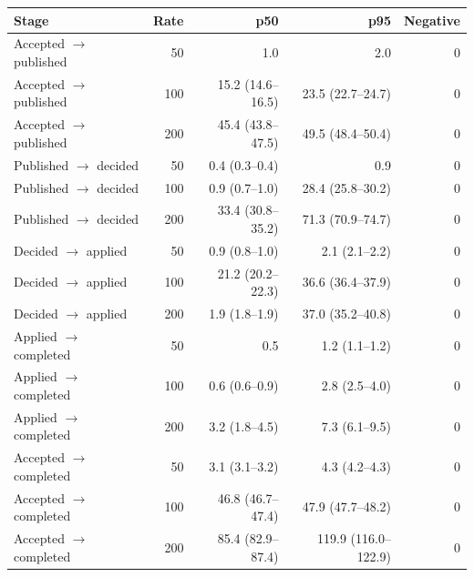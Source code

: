 \begin{tabular}{lrrrr}
\toprule
Stage & Rate & p50 & p95 & Negative \\
\midrule
Accepted $\to$ published & 50 & 1.0 & 2.0 & 0 \\
Accepted $\to$ published & 100 & 15.2 (14.6--16.5) & 23.5 (22.7--24.7) & 0 \\
Accepted $\to$ published & 200 & 45.4 (43.8--47.5) & 49.5 (48.4--50.4) & 0 \\
\addlinespace[2pt]
Published $\to$ decided & 50 & 0.4 (0.3--0.4) & 0.9 & 0 \\
Published $\to$ decided & 100 & 0.9 (0.7--1.0) & 28.4 (25.8--30.2) & 0 \\
Published $\to$ decided & 200 & 33.4 (30.8--35.2) & 71.3 (70.9--74.7) & 0 \\
\addlinespace[2pt]
Decided $\to$ applied & 50 & 0.9 (0.8--1.0) & 2.1 (2.1--2.2) & 0 \\
Decided $\to$ applied & 100 & 21.2 (20.2--22.3) & 36.6 (36.4--37.9) & 0 \\
Decided $\to$ applied & 200 & 1.9 (1.8--1.9) & 37.0 (35.2--40.8) & 0 \\
\addlinespace[2pt]
Applied $\to$ completed & 50 & 0.5 & 1.2 (1.1--1.2) & 0 \\
Applied $\to$ completed & 100 & 0.6 (0.6--0.9) & 2.8 (2.5--4.0) & 0 \\
Applied $\to$ completed & 200 & 3.2 (1.8--4.5) & 7.3 (6.1--9.5) & 0 \\
\addlinespace[2pt]
Accepted $\to$ completed & 50 & 3.1 (3.1--3.2) & 4.3 (4.2--4.3) & 0 \\
Accepted $\to$ completed & 100 & 46.8 (46.7--47.4) & 47.9 (47.7--48.2) & 0 \\
Accepted $\to$ completed & 200 & 85.4 (82.9--87.4) & 119.9 (116.0--122.9) & 0 \\
\bottomrule
\end{tabular}
